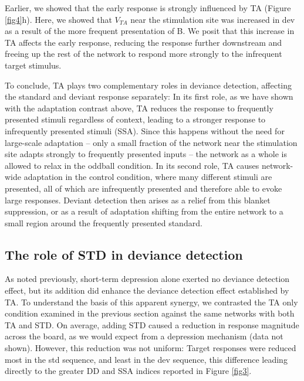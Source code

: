 \documentclass[pdflatex,referee,iicol,sn-basic]{sn-jnl}
\theoremstyle{thmstyleone}%
\theoremstyle{thmstyletwo}%
\theoremstyle{thmstylethree}%
\begin{document}
Earlier, we showed that the early response is strongly influenced by TA (Figure \ref{fig4}h). Here, we showed that $V_{TA}$ near the stimulation site was increased in dev as a result of the more frequent presentation of B. We posit that this increase in TA affects the early response, reducing the response further downstream and freeing up the rest of the network to respond more strongly to the infrequent target stimulus.

To conclude, TA plays two complementary roles in deviance detection, affecting the standard and deviant response separately: In its first role, as we have shown with the adaptation contrast above, TA reduces the response to frequently presented stimuli regardless of context, leading to a stronger response to infrequently presented stimuli (SSA). Since this happens without the need for large-scale adaptation -- only a small fraction of the network near the stimulation site adapts strongly to frequently presented inputs -- the network as a whole is allowed to relax in the oddball condition. In its second role, TA causes network-wide adaptation in the control condition, where many different stimuli are presented, all of which are infrequently presented and therefore able to evoke large responses. Deviant detection then arises as a relief from this blanket suppression, or as a result of adaptation shifting from the entire network to a small region around the frequently presented standard.

\subsection{The role of STD in deviance detection}\label{sec-std}

As noted previously, short-term depression alone exerted no deviance detection effect, but its addition did enhance the deviance detection effect established by TA. To understand the basis of this apparent synergy, we contrasted the TA only condition examined in the previous section against the same networks with both TA and STD. On average, adding STD caused a reduction in response magnitude across the board, as we would expect from a depression mechanism (data not shown). However, this reduction was not uniform: Target responses were reduced most in the std sequence, and least in the dev sequence, this difference leading directly to the greater DD and SSA indices reported in Figure \ref{fig3}.
\end{document}
